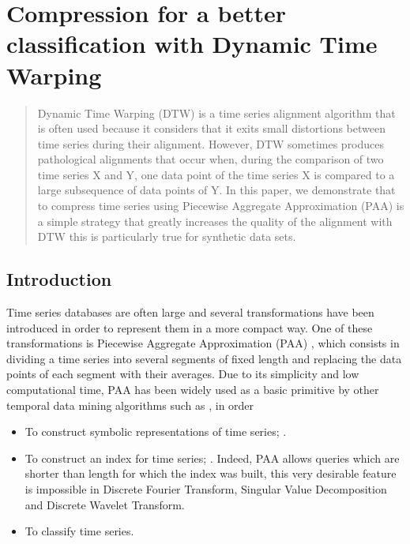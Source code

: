 \chapter[Preprocessing of time series]{Compression for a better classification with Dynamic Time Warping}

\begin{abstract}
 Dynamic Time Warping (DTW) is a time series alignment algorithm that is often used because it
 considers that it exits small distortions between time series during their alignment.  However, DTW
 sometimes produces pathological alignments that occur when, during the comparison of two time series
 X and Y, one data point of the time series X is compared to a large subsequence of data points of Y.
 In this paper, we demonstrate that to compress time series using Piecewise Aggregate Approximation
 (PAA) is a simple strategy that greatly increases the quality of the alignment with DTW this is
 particularly true for synthetic data sets.      
 \end{abstract}

\section{Introduction}

Time series databases are often large and several transformations have been
introduced in order to represent them in a more compact way. One of these transformations is
Piecewise Aggregate Approximation (PAA) \cite{keogh2001dimensionality}, which consists in dividing a
time series into several segments of fixed length and replacing the data points of each segment with
their averages. Due to its simplicity and low computational time, PAA has been widely used as a
basic primitive by other temporal data mining algorithms such as \cite{lin2003symbolic,
sun2014improvement, lkhagva2006extended}, in order  
\begin{itemize}
  \item To construct symbolic representations of time
series; \cite{camerra2010isax, ulanova2015scalable}.
  \item To construct an index for time series; \cite{zhao2016shapedtw,
keogh2000scaling, Kate2016}. Indeed, PAA allows queries which are shorter than length for which the
index was built, this very desirable feature is impossible in Discrete Fourier Transform, Singular
Value Decomposition and Discrete Wavelet Transform.
\item To classify time series.
\end{itemize}


